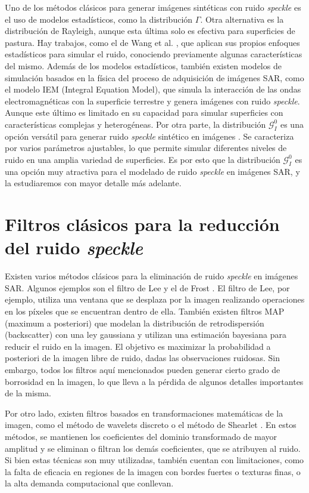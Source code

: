 Uno de los métodos clásicos para generar imágenes sintéticas con ruido \emph{speckle} es el uso de modelos estadísticos, como la distribución $\Gamma$. Otra alternativa es la distribución de Rayleigh, aunque esta última solo es efectiva para superficies de pastura. Hay trabajos, como el de Wang et al. \cite{wang2017sar}, que aplican sus propios enfoques estadísticos para simular el ruido, conociendo previamente algunas características del mismo. Además de los modelos estadísticos, también existen modelos de simulación basados en la física del proceso de adquisición de imágenes SAR, como el modelo IEM (Integral Equation Model), que simula la interacción de las ondas electromagnéticas con la superficie terrestre y genera imágenes con ruido \emph{speckle}. Aunque este último es limitado en su capacidad para simular superficies con características complejas y heterogéneas. Por otra parte, la distribución \( \mathcal{G}_I^0 \) es una opción versátil para generar ruido \emph{speckle} sintético en imágenes \cite{originalGI0}. Se caracteriza por varios parámetros ajustables, lo que permite simular diferentes niveles de ruido en una amplia variedad de superficies. Es por esto que la distribución \( \mathcal{G}_I^0 \) es una opción muy atractiva para el modelado de ruido \emph{speckle} en imágenes SAR, y la estudiaremos con mayor detalle más adelante.

\section{Filtros clásicos para la reducción del ruido \emph{speckle}}

Existen varios métodos clásicos para la eliminación de ruido \emph{speckle} en imágenes SAR.
Algunos ejemplos son el filtro de Lee \cite{lee1980digital} y el de Frost \cite{frost1982model}. El filtro de Lee, por ejemplo, utiliza una ventana que se desplaza por la imagen realizando operaciones en los píxeles que se encuentran dentro de ella. También existen filtros MAP (maximum a posteriori) \cite{kuan1987adaptive} que modelan la distribución de retrodispersión (backscatter) con una ley gaussiana y utilizan una estimación bayesiana para reducir el ruido en la imagen. El objetivo es maximizar la probabilidad a posteriori de la imagen libre de ruido, dadas las observaciones ruidosas. Sin embargo, todos los filtros aquí mencionados pueden generar cierto grado de borrosidad en la imagen, lo que lleva a la pérdida de algunos detalles importantes de la misma.

Por otro lado, existen filtros basados en transformaciones matemáticas de la imagen, como el método de wavelets discreto \cite{zhang2017nonmodel} o el método de Shearlet \cite{hou2012shearlet}. En estos métodos, se mantienen los coeficientes del dominio transformado de mayor amplitud y se eliminan o filtran los demás coeficientes, que se atribuyen al ruido. Si bien estas técnicas son muy utilizadas, también cuentan con limitaciones, como la falta de eficacia en regiones de la imagen con bordes fuertes o texturas finas, o la alta demanda computacional que conllevan.

